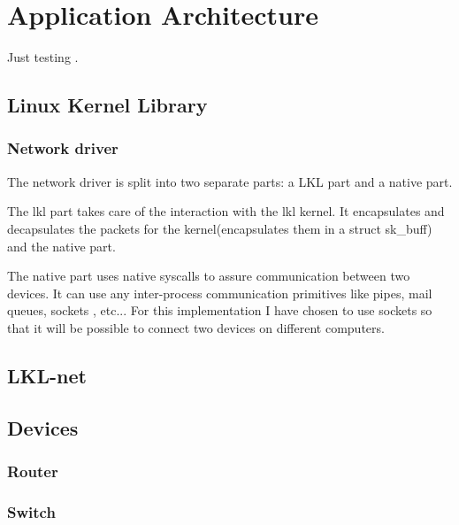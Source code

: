 \chapter{Application Architecture}
\label{chapter:arch}

Just testing \cite{linnetarch}.

\section{Linux Kernel Library}
\label{sec:lkl}

\subsection{Network driver}
\label{sec:net-driver}

The network driver is split into two separate parts: a LKL part and a native part.

The lkl part takes care of the interaction with the lkl kernel. It encapsulates
and decapsulates the packets for the kernel(encapsulates them in a struct sk_buff)
and the native part.

The native part uses native syscalls to assure communication between two devices.
It can use any inter-process communication primitives like pipes, mail queues, sockets
, etc... For this implementation I have chosen to use sockets so that it will be possible
to connect two devices on different computers.


\section{LKL-net}
\label{sec:lkl-net}


\theproject

\section{Devices}
\label{sec:devices}

\subsection{Router}
\label{sub-sec:router}

\subsection{Switch}
\label{sub-sec:switch}

